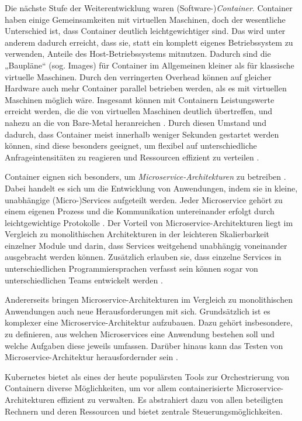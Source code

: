 \documentclass[11pt,a4paper]{article}
\begin{document}
Die nächste Stufe der Weiterentwicklung waren (Software-)\emph{Container}. Container haben einige Gemeinsamkeiten mit virtuellen Maschinen, doch der wesentliche Unterschied ist,
dass Container deutlich leichtgewichtiger sind. Das wird unter anderem dadurch erreicht, dass sie, statt ein komplett eigenes Betriebssystem zu verwenden,
Anteile des Host-Betriebssystems mitnutzen. Dadurch sind die „Baupläne“ (sog. Images) für Container im Allgemeinen kleiner als für klassische virtuelle Maschinen.
Durch den verringerten Overhead können auf gleicher Hardware auch mehr Container parallel betrieben werden, als es mit virtuellen Maschinen möglich wäre.
Insgesamt können mit Containern Leistungswerte erreicht werden, die die von virtuellen Maschinen deutlich übertreffen,
und nahezu an die von Bare-Metal heranreichen \cite{10.1145/1272998.1273025}.
Durch diesen Umstand und dadurch, dass Container meist innerhalb weniger Sekunden gestartet werden können, sind diese besonders geeignet,
um flexibel auf unterschiedliche Anfrageintensitäten zu reagieren und Ressourcen effizient zu verteilen \cite{kofler2021docker}.

Container eignen sich besonders, um \emph{Microservice-Architekturen} zu betreiben \cite{7158965}. Dabei handelt es sich um die
Entwicklung von Anwendungen, indem sie in kleine, unabhängige (Micro-)Services aufgeteilt werden. Jeder Microservice gehört zu
einem eigenen Prozess und die Kommunikation untereinander erfolgt durch leichtgewichtige Protokolle \cite{8406008}.
Der Vorteil von Microservice-Architekturen liegt im Vergleich zu monolithischen Architekturen in der
leichteren Skalierbarkeit einzelner Module und darin, dass Services weitgehend unabhängig voneinander
ausgebracht werden können. Zusätzlich erlauben sie, dass einzelne Services in unterschiedlichen Programmiersprachen
verfasst sein können sogar von unterschiedlichen Teams entwickelt werden \cite{microservices}.

Andererseits bringen Microservice-Architekturen im Vergleich zu monolithischen Anwendungen
auch neue Herausforderungen mit sich.
Grundsätzlich ist es komplexer eine Microservice-Architektur aufzubauen.
Dazu gehört insbesondere, zu definieren, aus welchen Microservices eine Anwendung bestehen soll
und welche Aufgaben diese jeweils umfassen. Darüber hinaus kann das Testen von Microservice-Architektur
herausfordernder sein \cite{8406008}.

Kubernetes bietet als eines der heute populärsten Tools zur Orchestrierung von Containern
diverse Möglichkeiten, um vor allem containerisierte Microservice-Architekturen effizient zu verwalten.
Es abstrahiert dazu von allen beteiligten Rechnern und deren Ressourcen und bietet zentrale Steuerungsmöglichkeiten.
\cite{Pagani_2019} %
\end{document}
